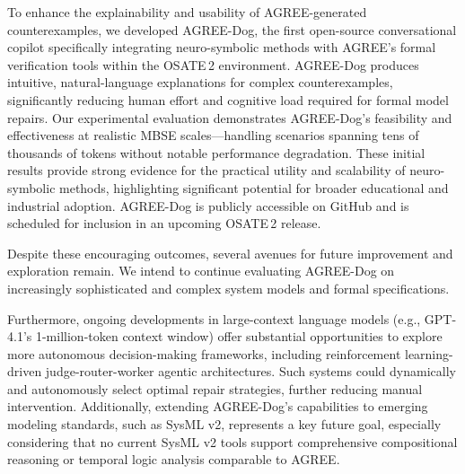 \label{sec:limitations}


To enhance the explainability and usability of AGREE-generated counterexamples, we developed AGREE-Dog, the first open-source conversational copilot specifically integrating neuro-symbolic methods with AGREE's formal verification tools within the OSATE\,2 environment. AGREE-Dog produces intuitive, natural-language explanations for complex counterexamples, significantly reducing human effort and cognitive load required for formal model repairs. Our experimental evaluation demonstrates AGREE-Dog's feasibility and effectiveness at realistic MBSE scales—handling scenarios spanning tens of thousands of tokens without notable performance degradation. These initial results provide strong evidence for the practical utility and scalability of neuro-symbolic methods, highlighting significant potential for broader educational and industrial adoption. AGREE-Dog is publicly accessible on GitHub and is scheduled for inclusion in an upcoming OSATE\,2 release.

Despite these encouraging outcomes, several avenues for future improvement and exploration remain. We intend to continue evaluating AGREE-Dog on increasingly sophisticated and complex system models and formal specifications. %

Furthermore, ongoing developments in large-context language models (e.g., GPT-4.1’s 1-million-token context window) offer substantial opportunities to explore more autonomous decision-making frameworks, including reinforcement learning-driven judge-router-worker agentic architectures. Such systems could dynamically and autonomously select optimal repair strategies, further reducing manual intervention. Additionally, extending AGREE-Dog’s capabilities to emerging modeling standards, such as SysML v2, represents a key future goal, especially considering that no current SysML v2 tools support comprehensive compositional reasoning or temporal logic analysis comparable to AGREE.

